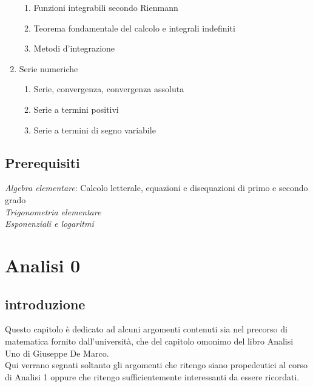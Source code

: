 \documentclass[12pt, a4paper, openany]{book}
\begin{document}
\begin{enumerate}
\begin{enumerate}
    \item Funzioni integrabili secondo Rienmann
    \item Teorema fondamentale del calcolo e integrali indefiniti
    \item Metodi d'integrazione
\end{enumerate}
\item Serie numeriche
\begin{enumerate}
    \item Serie, convergenza, convergenza assoluta
    \item Serie a termini positivi
    \item Serie a termini di segno variabile
\end{enumerate}
\end{enumerate}

\section{Prerequisiti}
\emph{Algebra elementare}: Calcolo letterale, equazioni e disequazioni di primo e secondo grado
\\\emph{Trigonometria elementare}
\\\emph{Esponenziali e logaritmi}

\chapter{Analisi 0}
\section{introduzione}
Questo capitolo è dedicato ad alcuni argomenti contenuti sia nel precorso di matematica fornito dall'università, che del capitolo omonimo del libro Analisi Uno di Giuseppe De Marco.
\\Qui verrano segnati soltanto gli argomenti che ritengo siano propedeutici al corso di Analisi 1 oppure che ritengo sufficientemente interessanti da essere ricordati.
\end{document}
